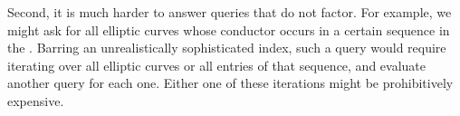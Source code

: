 Second, it is much harder to answer queries that do not factor.
For example, we might ask for all elliptic curves whose conductor occurs in a certain sequence in the \OEIS.
Barring an unrealistically sophisticated index, such a query would require iterating over all elliptic curves or all entries of that sequence, and evaluate another query for each one.
Either one of these iterations might be prohibitively expensive.

